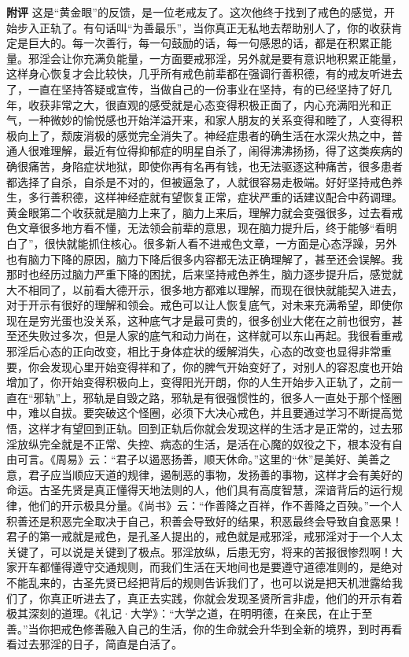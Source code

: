 \begin{case}
    \textbf{附评} 这是“黄金眼”的反馈，是一位老戒友了。这次他终于找到了戒色的感觉，开始步入正轨了。有句话叫“为善最乐”，当你真正无私地去帮助别人了，你的收获肯定是巨大的。每一次善行，每一句鼓励的话，每一句感恩的话，都是在积累正能量。邪淫会让你充满负能量，一方面要戒邪淫，另外就是要有意识地积累正能量，这样身心恢复才会比较快，几乎所有戒色前辈都在强调行善积德，有的戒友听进去了，一直在坚持答疑或宣传，当做自己的一份事业在坚持，有的已经坚持了好几年，收获非常之大，很直观的感受就是心态变得积极正面了，内心充满阳光和正气，一种微妙的愉悦感也开始洋溢开来，和家人朋友的关系变得和睦了，人变得积极向上了，颓废消极的感觉完全消失了。神经症患者的确生活在水深火热之中，普通人很难理解，最近有位得抑郁症的明星自杀了，闹得沸沸扬扬，得了这类疾病的确很痛苦，身陷症状地狱，即使你再有名再有钱，也无法驱逐这种痛苦，很多患者都选择了自杀，自杀是不对的，但被逼急了，人就很容易走极端。好好坚持戒色养生，多行善积德，这样神经症就有望恢复正常，症状严重的话建议配合中药调理。黄金眼第二个收获就是脑力上来了，脑力上来后，理解力就会变强很多，过去看戒色文章很多地方看不懂，无法领会前辈的意思，现在脑力提升后，终于能够“看明白了”，很快就能抓住核心。很多新人看不进戒色文章，一方面是心态浮躁，另外也有脑力下降的原因，脑力下降后很多内容都无法正确理解了，甚至还会误解。我那时也经历过脑力严重下降的困扰，后来坚持戒色养生，脑力逐步提升后，感觉就大不相同了，以前看大德开示，很多地方都难以理解，而现在很快就能契入进去，对于开示有很好的理解和领会。戒色可以让人恢复底气，对未来充满希望，即使你现在是穷光蛋也没关系，这种底气才是最可贵的，很多创业大佬在之前也很穷，甚至还失败过多次，但是人家的底气和动力尚在，这样就可以东山再起。我很看重戒邪淫后心态的正向改变，相比于身体症状的缓解消失，心态的改变也显得非常重要，你会发现心里开始变得祥和了，你的脾气开始变好了，对别人的容忍度也开始增加了，你开始变得积极向上，变得阳光开朗，你的人生开始步入正轨了，之前一直在“邪轨”上，邪轨是自毁之路，邪轨是有很强惯性的，很多人一直处于那个怪圈中，难以自拔。要突破这个怪圈，必须下大决心戒色，并且要通过学习不断提高觉悟，这样才有望回到正轨。回到正轨后你就会发现这样的生活才是正常的，过去邪淫放纵完全就是不正常、失控、病态的生活，是活在心魔的奴役之下，根本没有自由可言。《周易》云：“君子以遏恶扬善，顺天休命。”这里的“休”是美好、美善之意，君子应当顺应天道的规律，遏制恶的事物，发扬善的事物，这样才会有美好的命运。古圣先贤是真正懂得天地法则的人，他们具有高度智慧，深谙背后的运行规律，他们的开示极具分量。《尚书》云：“作善降之百祥，作不善降之百殃。”一个人积善还是积恶完全取决于自己，积善会导致好的结果，积恶最终会导致自食恶果！君子的第一戒就是戒色，是孔圣人提出的，戒色就是戒邪淫，戒邪淫对于一个人太关键了，可以说是关键到了极点。邪淫放纵，后患无穷，将来的苦报很惨烈啊！大家开车都懂得遵守交通规则，而我们生活在天地间也是要遵守道德准则的，是绝对不能乱来的，古圣先贤已经把背后的规则告诉我们了，也可以说是把天机泄露给我们了，你真正听进去了，真正去实践，你就会发现圣贤所言非虚，他们的开示有着极其深刻的道理。《礼记·大学》：“大学之道，在明明德，在亲民，在止于至善。”当你把戒色修善融入自己的生活，你的生命就会升华到全新的境界，到时再看看过去邪淫的日子，简直是白活了。
\end{case}

